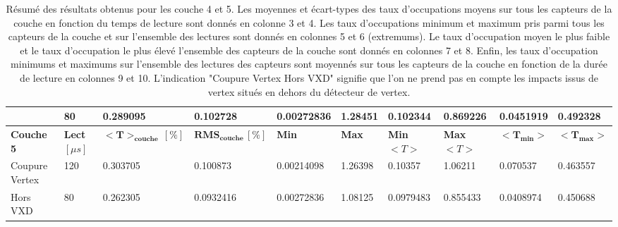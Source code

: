 \begin{table}
\begin{center}
\begin{tabular}{|l|l|l|l|l|l|l|l|l|l|}
                              & 80            & 0.289095                 & 0.102728                & 0.00272836 & 1.28451   & 0.102344      & 0.869226      & 0.0451919       & 0.492328        \\ \hline
\textbf{Couche 5} & \textbf{Lect} $[\mu s]$ & $\mathbf{<T>_{couche} \, [\%]}$ & $\mathbf{RMS_{couche} \, [\%]}$ & \textbf{Min} & \textbf{Max} & \textbf{Min} $<T>$ & \textbf{Max} $<T>$ & $\mathbf{<T_{min}>}$ & $\mathbf{<T_{max}>}$ \\ \hline
Coupure Vertex                & 120           & 0.303705                 & 0.100873                & 0.00214098 & 1.26398   & 0.10357       & 1.06211       & 0.070537        & 0.463557        \\ \hline
Hors VXD                      & 80            & 0.262305                 & 0.0932416               & 0.00272836 & 1.08125   & 0.0979483     & 0.855433      & 0.0408974       & 0.450688        \\ \hline
\end{tabular}
\caption{R\'esum\'e des r\'esultats obtenus pour les couche 4 et 5. Les moyennes et \'ecart-types des taux d'occupations moyens sur tous les capteurs de la couche en fonction du temps de lecture sont donn\'es en colonne 3 et 4. Les taux d'occupations minimum et maximum pris parmi tous les capteurs de la couche et sur l'ensemble des lectures sont donn\'es en colonnes 5 et 6 (extremums). Le taux d'occupation moyen le plus faible et le taux d'occupation le plus \'elev\'e l'ensemble des capteurs de la couche sont donn\'es en colonnes 7 et 8. Enfin, les taux d'occupation minimums et maximums sur l'ensemble des lectures des capteurs sont moyenn\'es sur tous les capteurs de la couche en fonction de la dur\'ee de lecture en colonnes 9 et 10. L'indication "Coupure Vertex Hors VXD" signifie que l'on ne prend pas en compte les impacts issus de vertex situ\'es en dehors du d\'etecteur de vertex.}
\label{tab:couche_4_5_occupations}
\end{center}
\end{table}


